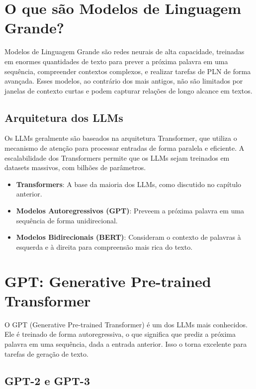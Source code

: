 \documentclass[14pt,a4paper,oneside]{book}
\begin{document}
\section{O que são Modelos de Linguagem Grande?}

Modelos de Linguagem Grande são redes neurais de alta capacidade, treinadas em enormes quantidades de texto para prever a próxima palavra em uma sequência, compreender contextos complexos, e realizar tarefas de PLN de forma avançada. Esses modelos, ao contrário dos mais antigos, não são limitados por janelas de contexto curtas e podem capturar relações de longo alcance em textos.

\subsection{Arquitetura dos LLMs}

Os LLMs geralmente são baseados na arquitetura Transformer, que utiliza o mecanismo de atenção para processar entradas de forma paralela e eficiente. A escalabilidade dos Transformers permite que os LLMs sejam treinados em datasets massivos, com bilhões de parâmetros.

\begin{itemize}
	\item \textbf{Transformers}: A base da maioria dos LLMs, como discutido no capítulo anterior.
	\item \textbf{Modelos Autoregressivos (GPT)}: Preveem a próxima palavra em uma sequência de forma unidirecional.
	\item \textbf{Modelos Bidirecionais (BERT)}: Consideram o contexto de palavras à esquerda e à direita para compreensão mais rica do texto.
\end{itemize}

\section{GPT: Generative Pre-trained Transformer}

O GPT (Generative Pre-trained Transformer) é um dos LLMs mais conhecidos. Ele é treinado de forma autoregressiva, o que significa que prediz a próxima palavra em uma sequência, dada a entrada anterior. Isso o torna excelente para tarefas de geração de texto.

\subsection{GPT-2 e GPT-3}
\end{document}
